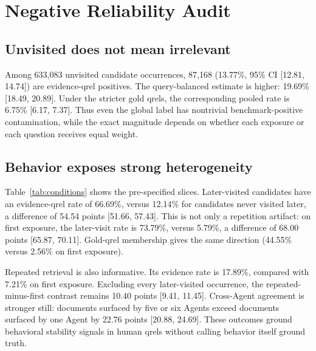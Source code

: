 \section{Negative Reliability Audit}

\subsection{Unvisited does not mean irrelevant}

Among 633,083 unvisited candidate occurrences, 87,168 (13.77\%, 95\% CI [12.81, 14.74]) are evidence-qrel positives. The query-balanced estimate is higher: 19.69\% [18.49, 20.89]. Under the stricter gold qrels, the corresponding pooled rate is 6.75\% [6.17, 7.37]. Thus even the global label has nontrivial benchmark-positive contamination, while the exact magnitude depends on whether each exposure or each question receives equal weight.

\subsection{Behavior exposes strong heterogeneity}

Table~\ref{tab:conditions} shows the pre-specified slices. Later-visited candidates have an evidence-qrel rate of 66.69\%, versus 12.14\% for candidates never visited later, a difference of 54.54 points [51.66, 57.43]. This is not only a repetition artifact: on first exposure, the later-visit rate is 73.79\%, versus 5.79\%, a difference of 68.00 points [65.87, 70.11]. Gold-qrel membership gives the same direction (44.55\% versus 2.56\% on first exposure).

Repeated retrieval is also informative. Its evidence rate is 17.89\%, compared with 7.21\% on first exposure. Excluding every later-visited occurrence, the repeated-minus-first contrast remains 10.40 points [9.41, 11.45]. Cross-Agent agreement is stronger still: documents surfaced by five or six Agents exceed documents surfaced by one Agent by 22.76 points [20.88, 24.69]. These outcomes ground behavioral stability signals in human qrels without calling behavior itself ground truth.

